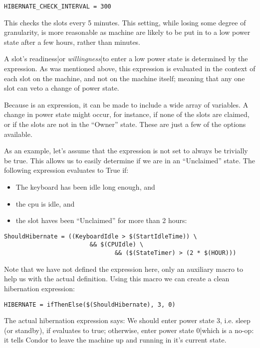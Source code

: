 \begin{verbatim}
HIBERNATE_CHECK_INTERVAL = 300
\end{verbatim}

This checks the slots every 5 minutes.  This setting, while losing some 
degree of granularity, is more reasonable as machine are likely to be put 
in to a low power state after a few hours, rather than minutes.
 
A slot's readiness|or \textit{willingness}|to enter a low power state is 
determined by the  expression.  As was mentioned above, this 
expression is evaluated in the context of each slot on the machine, and not 
on the machine itself; meaning that any one slot can veto a change of power 
state.  

Because  is an expression, it can be made to include a wide
array of variables.  A change in power state might occur, for instance, if 
none of the slots are claimed, or if the slots are not in the ``Owner'' state.
These are just a few of the options available.

As an example, let's assume that the  expression is not set to
always be trivially be true.  This allows us to easily determine if
we are in an ``Unclaimed'' state.  The following expression evaluates
to True if:

\begin{itemize}
\item The keyboard has been idle long enough, and
\item the cpu is idle, and
\item the slot haves been ``Unclaimed'' for more than 2 hours:
\end{itemize}

\begin{verbatim}
ShouldHibernate = ((KeyboardIdle > $(StartIdleTime)) \
                        && $(CPUIdle) \
                               && ($(StateTimer) > (2 * $(HOUR)))
\end{verbatim}

Note that we have not defined the  expression here, only an 
auxiliary macro to help us with the actual definition.  Using this macro we 
can create a clean hibernation expression:

\begin{verbatim}
HIBERNATE = ifThenElse($(ShouldHibernate), 3, 0)
\end{verbatim} %

The actual hibernation expression says: We should enter power state $3$,
i.e. sleep (or standby), if  evaluates to true; 
otherwise, enter power state $0$|which is a no-op: it tells Condor to leave 
the machine up and running in it's current state. 

